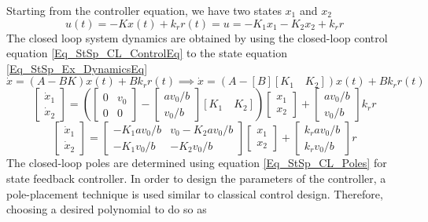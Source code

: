 Starting from the controller equation, we have two states $x_1$ and $x_2$
\begin{equation} \label{Eq_StSp_CL_ControlEq}
	u(t) = -Kx(t) + k_r r(t) = u = -K_{1}x_{1} - K_{2}x_{2} + k_r r
\end{equation}
The closed loop system dynamics are obtained by using the closed-loop control equation \eqref{Eq_StSp_CL_ControlEq} to the state equation \eqref{Eq_StSp_Ex_DynamicsEq}
\begin{equation}
	\dot{x} = (A - B K) x(t) + B k_r r(t) \implies \dot{x} = (A - [B] [K_1 \quad K_2]) x(t) + B k_r r(t)
\end{equation}
\begin{equation}
	\begin{bmatrix}
	\dot{x}_1 \\ \dot{x}_2
	\end{bmatrix} = \left( \begin{bmatrix}
	0 & v_0 \\ 0 & 0
	\end{bmatrix} - \begin{bmatrix}
	a v_0/b \\ v_0 / b
	\end{bmatrix} [K_1 \quad K_2] \right) \begin{bmatrix}
	{x}_1 \\ {x}_2
	\end{bmatrix} + \begin{bmatrix}
	a v_0/b \\ v_0 / b
	\end{bmatrix} k_r r
\end{equation}
\begin{equation}
	\begin{bmatrix}
	\dot{x}_1 \\ \dot{x}_2
	\end{bmatrix} = \begin{bmatrix}
	-K_{1} a v_{0}/b & v_0 -K_{2} a v_{0}/b \\ -K_{1} v_{0}/b & -K_{2} v_{0}/b
	\end{bmatrix} \begin{bmatrix}
	{x}_1 \\ {x}_2
	\end{bmatrix} + \begin{bmatrix}
	k_{r} a v_0/b \\ k_{r} v_0 / b
	\end{bmatrix} r
\end{equation}
The closed-loop poles are determined using equation \eqref{Eq_StSp_CL_Poles} for state feedback controller. In order to design the parameters of the controller, a pole-placement technique is used similar to classical control design. Therefore, choosing a desired polynomial to do so as
